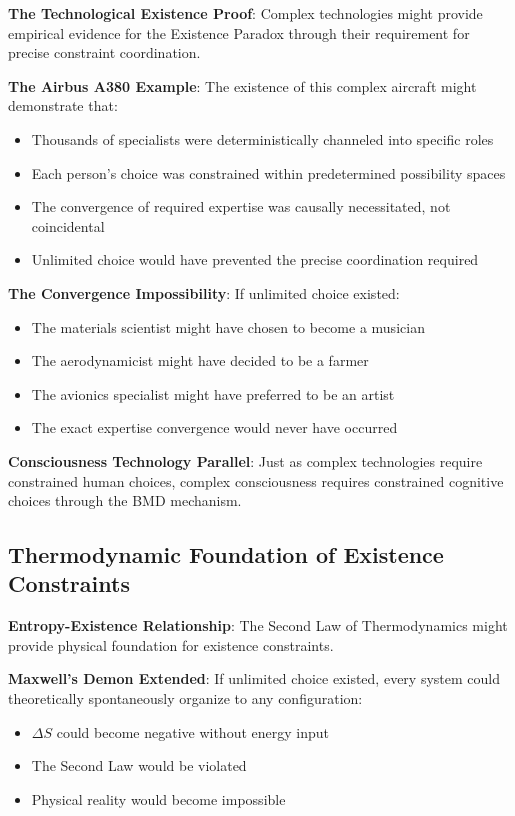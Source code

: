 \documentclass[12pt]{article}
\begin{document}
\textbf{The Technological Existence Proof}: Complex technologies might provide empirical evidence for the Existence Paradox through their requirement for precise constraint coordination.

\textbf{The Airbus A380 Example}: The existence of this complex aircraft might demonstrate that:
\begin{itemize}
\item Thousands of specialists were deterministically channeled into specific roles
\item Each person's choice was constrained within predetermined possibility spaces
\item The convergence of required expertise was causally necessitated, not coincidental
\item Unlimited choice would have prevented the precise coordination required
\end{itemize}

\textbf{The Convergence Impossibility}: If unlimited choice existed:
\begin{itemize}
\item The materials scientist might have chosen to become a musician
\item The aerodynamicist might have decided to be a farmer
\item The avionics specialist might have preferred to be an artist
\item The exact expertise convergence would never have occurred
\end{itemize}

\textbf{Consciousness Technology Parallel}: Just as complex technologies require constrained human choices, complex consciousness requires constrained cognitive choices through the BMD mechanism.

\subsection{Thermodynamic Foundation of Existence Constraints}

\textbf{Entropy-Existence Relationship}: The Second Law of Thermodynamics might provide physical foundation for existence constraints.

\textbf{Maxwell's Demon Extended}: If unlimited choice existed, every system could theoretically spontaneously organize to any configuration:
\begin{itemize}
\item $\Delta S$ could become negative without energy input
\item The Second Law would be violated
\item Physical reality would become impossible
\end{itemize}
\end{document}
